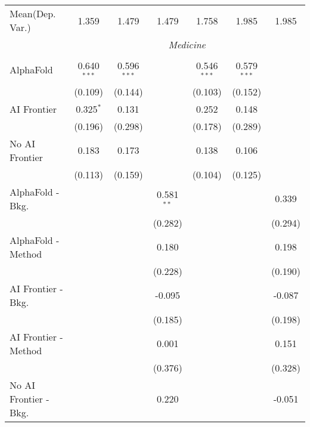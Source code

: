 \begin{tabular}{lcccccc}
Mean(Dep. Var.) & 1.359 & 1.479 & 1.479 & 1.758 & 1.985 & 1.985 \\
 & \multicolumn{6}{c}{\textit{Medicine}} \\ \\
   AlphaFold               & 0.640$^{***}$ & 0.596$^{***}$ &              & 0.546$^{***}$ & 0.579$^{***}$ &   \\   
                           & (0.109)       & (0.144)       &              & (0.103)       & (0.152)       &   \\   
   AI Frontier             & 0.325$^{*}$   & 0.131         &              & 0.252         & 0.148         &   \\   
                           & (0.196)       & (0.298)       &              & (0.178)       & (0.289)       &   \\   
   No AI Frontier          & 0.183         & 0.173         &              & 0.138         & 0.106         &   \\   
                           & (0.113)       & (0.159)       &              & (0.104)       & (0.125)       &   \\   
   AlphaFold - Bkg.        &               &               & 0.581$^{**}$ &               &               & 0.339\\   
                           &               &               & (0.282)      &               &               & (0.294)\\   
   AlphaFold - Method      &               &               & 0.180        &               &               & 0.198\\   
                           &               &               & (0.228)      &               &               & (0.190)\\   
   AI Frontier - Bkg.      &               &               & -0.095       &               &               & -0.087\\   
                           &               &               & (0.185)      &               &               & (0.198)\\   
   AI Frontier - Method    &               &               & 0.001        &               &               & 0.151\\   
                           &               &               & (0.376)      &               &               & (0.328)\\   
   No AI Frontier - Bkg.   &               &               & 0.220        &               &               & -0.051\\   

\end{tabular}

